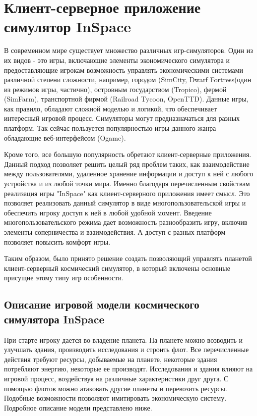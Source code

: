 





\tableofcontents
\newpage



\section{Клиент-серверное приложение симулятор InSpace}
\label{descr}
В современном мире существует множество различных игр-симуляторов. Один из их видов - это игры, включающие элементы экономического симулятора и предоставляющие игрокам возможность управлять экономическими системами различной степени сложности, например, городом (SimCity, Dwarf Fortress(один из режимов игры, частично), островным государством (Tropico), фермой (SimFarm), транспортной фирмой (Railroad Tycoon, OpenTTD). Данные игры, как правило, обладают сложной моделью и логикой, что обеспечивает интересный игровой процесс. Симуляторы могут предназначаться для разных платформ. Так сейчас пользуется популярностью игры данного жанра обладающие веб-интерфейсом (Ogame). 

Кроме того, все большую популярность обретают клиент-серверные приложения. Данный подход позволяет решить целый ряд проблем таких, как взаимодействие между пользователями, удаленное хранение информации и доступ к ней с любого устройства и из любой точки мира. Именно благодаря перечисленным свойствам реализация игры "InSpace" как клиент-серверного приложения имеет смысл. Это позволяет реализовать данный симулятор в виде многопользовательской игры и обеспечить игроку доступ к ней в любой удобной момент. Введение многопользовательского режима дает возможность разнообразить игру, включив элементы соперничества и взаимодействия. А доступ с разных платформ позволяет повысить комфорт игры.

Таким образом, было принято решение создать позволяющий управлять планетой клиент-серверный космический симулятор, в который включены основные присущие этому типу игр особенности. 

\subsection{Описание игровой модели космического симулятора InSpace}

При старте игроку дается во владение планета. На планете можно возводить и улучшать здания, производить исследования и строить флот. Все перечисленные действия требуют ресурсы, добываемые на планете, некоторые здания потребляют энергию, некоторые ее производят. Исследования и здания влияют на игровой процесс, воздействуя на различные характеристики друг друга. С помощью флотов можно атаковать другие планеты и перевозить ресурсы. Подобные возможности позволяют имитировать экономическую систему. Подробное описание модели представлено ниже.

